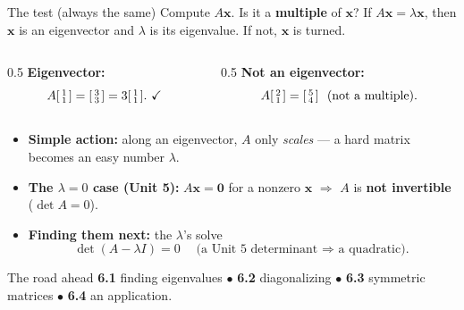 \documentclass[aspectratio=169, 11pt]{beamer}
\newcommand{\xx}{\mathbf{x}}
\begin{document}
\begin{frame}[t, plain]
  \begin{block}{The test (always the same)}
    Compute $A\xx$. \; Is it a \textbf{multiple} of $\xx$? \; If $A\xx=\lambda\xx$, then $\xx$ is an
    eigenvector and $\lambda$ is its eigenvalue. If not, $\xx$ is turned.
  \end{block}
  \begin{columns}[T]
    \begin{column}{0.5\textwidth}
      \textbf{Eigenvector:}
      \[ A\begin{bsmallmatrix} 1\\1 \end{bsmallmatrix}=\begin{bsmallmatrix} 3\\3 \end{bsmallmatrix}=3\begin{bsmallmatrix} 1\\1 \end{bsmallmatrix}.\ \checkmark \]
    \end{column}
    \begin{column}{0.5\textwidth}
      \textbf{Not an eigenvector:}
      \[ A\begin{bsmallmatrix} 2\\1 \end{bsmallmatrix}=\begin{bsmallmatrix} 5\\4 \end{bsmallmatrix}\ \ (\text{not a multiple}). \]
    \end{column}
  \end{columns}
\end{frame}

\begin{frame}[t, plain]
  \begin{itemize}
    \setlength{\itemsep}{6pt}
    \item \textbf{Simple action:} along an eigenvector, $A$ only \emph{scales} --- a hard matrix
          becomes an easy number $\lambda$.
    \item \textbf{The $\lambda=0$ case (Unit 5):} $A\xx=\mathbf{0}$ for a nonzero $\xx$ $\Rightarrow$
          $A$ is \textbf{not invertible} ($\det A=0$).
    \item \textbf{Finding them next:} the $\lambda$'s solve
          \[ \det(A-\lambda I)=0 \quad\text{(a Unit 5 determinant $\Rightarrow$ a quadratic).} \]
  \end{itemize}
  \vspace{2pt}
  \begin{block}{The road ahead}
    \textbf{6.1} finding eigenvalues \;$\bullet$\; \textbf{6.2} diagonalizing \;$\bullet$\;
    \textbf{6.3} symmetric matrices \;$\bullet$\; \textbf{6.4} an application.
  \end{block}
\end{frame}
\end{document}
